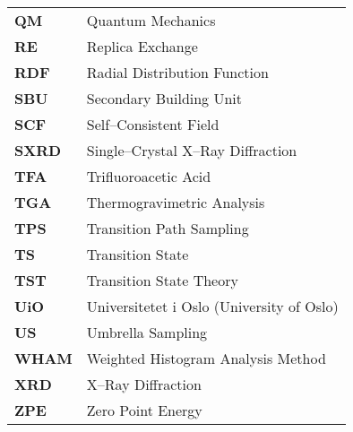 \begin{longtable}{p{} p{}}
\textbf{QM} & Quantum Mechanics \\
\textbf{RE} & Replica Exchange \\
\textbf{RDF} & Radial Distribution Function \\
\textbf{SBU} & Secondary Building Unit \\
\textbf{SCF} & Self--Consistent Field\\
\textbf{SXRD} & Single--Crystal X--Ray Diffraction\\
\textbf{TFA} & Trifluoroacetic Acid\\
\textbf{TGA} & Thermogravimetric Analysis\\
\textbf{TPS} & Transition Path Sampling  \\
\textbf{TS}  & Transition State \\
\textbf{TST} & Transition State Theory  \\
\textbf{UiO} & Universitetet i Oslo (University of Oslo) \\ 
\textbf{US} & Umbrella Sampling  \\
\textbf{WHAM} & Weighted Histogram Analysis Method \\
\textbf{XRD} & X--Ray Diffraction\\
\textbf{ZPE} & Zero Point Energy\\
\end{longtable}